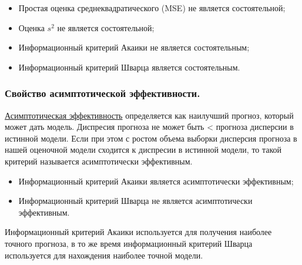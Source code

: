 \documentclass{article}
\begin{document}
\begin{itemize}
    \item Простая оценка среднеквадратического (MSE) не является состоятельной;
    \item Оценка $s^2$ не является состоятельной;
    \item Информационный критерий Акаики не является состоятельным;
    \item Информационный критерий Шварца является состоятельным. 
\end{itemize}

\subsubsection{Свойство асимптотической эффективности. }

\underline{Асимптотическая эффективность} определяется как наилучший прогноз, который может дать модель. Диспресия прогноза не может быть < прогноза дисперсии в истинной модели. Если при этом с ростом объема выборки дисперсия прогноза в нашей оценочной модели сходится к диспресии в истинной модели, то такой критерий называется асимптотически эффективным. 

\begin{itemize}
    \item Информационный критерий Акаики является асимптотически эффективным;
    \item Информационный критерий Шварца не является асимптотически эффективным. 
\end{itemize}

Информационный критерий Акаики используется для получения наиболее точного прогноза, в то же время информационный критерий Шварца используется для нахождения наиболее точной модели. 
\end{document}
